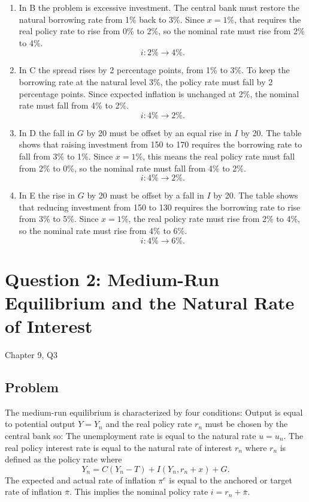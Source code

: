 \documentclass[12pt]{article}
\begin{document}
\begin{enumerate}[label=(\alph*)]
    \item
    In B the problem is excessive investment. The central bank must restore the natural borrowing rate from 1\% back to 3\%. Since \(x=1\%\), that requires the real policy rate to rise from 0\% to 2\%, so the nominal rate must rise from 2\% to 4\%.
    \[
    \boxed{i: 2\% \to 4\%.}
    \]

    \item
    In C the spread rises by 2 percentage points, from 1\% to 3\%. To keep the borrowing rate at the natural level 3\%, the policy rate must fall by 2 percentage points. Since expected inflation is unchanged at 2\%, the nominal rate must fall from 4\% to 2\%.
    \[
    \boxed{i: 4\% \to 2\%.}
    \]

    \item
    In D the fall in \(G\) by 20 must be offset by an equal rise in \(I\) by 20. The table shows that raising investment from 150 to 170 requires the borrowing rate to fall from 3\% to 1\%. Since \(x=1\%\), this means the real policy rate must fall from 2\% to 0\%, so the nominal rate must fall from 4\% to 2\%.
    \[
    \boxed{i: 4\% \to 2\%.}
    \]

    \item
    In E the rise in \(G\) by 20 must be offset by a fall in \(I\) by 20. The table shows that reducing investment from 150 to 130 requires the borrowing rate to rise from 3\% to 5\%. Since \(x=1\%\), the real policy rate must rise from 2\% to 4\%, so the nominal rate must rise from 4\% to 6\%.
    \[
    \boxed{i: 4\% \to 6\%.}
    \]
\end{enumerate}

\newpage
\section{Question 2: Medium-Run Equilibrium and the Natural Rate of Interest}

\noindent
Chapter 9, Q3

\subsection{Problem}
The medium-run equilibrium is characterized by four conditions: Output is equal to potential output \(Y=Y_n\) and the real policy rate \(r_n\) must be chosen by the central bank so: The unemployment rate is equal to the natural rate \(u=u_n\). The real policy interest rate is equal to the natural rate of interest \(r_n\) where \(r_n\) is defined as the policy rate where
\[
Y_n=C(Y_n-T)+I(Y_n,r_n+x)+G.
\]
The expected and actual rate of inflation \(\pi^e\) is equal to the anchored or target rate of inflation \(\bar{\pi}\). This implies the nominal policy rate \(i=r_n+\bar{\pi}\).
\end{document}
